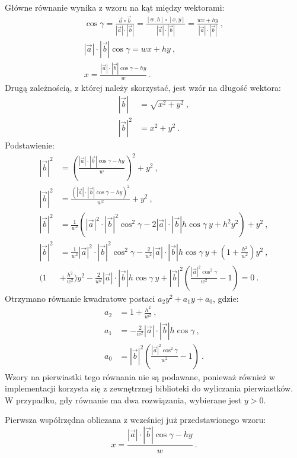 Główne równanie wynika z wzoru na kąt między wektorami:
\begin{gather*}
\cos \gamma = \frac{\vec{a}\circ\vec{b}}{|\vec{a}|\cdot |\vec{b}|} = \frac{[w, h]\circ[x, y]}{|\vec{a}|\cdot |\vec{b}|} = \frac{wx + hy}{|\vec{a}|\cdot |\vec{b}|}\ , \\[1em]
|\vec{a}|\cdot |\vec{b}| \cos \gamma = wx + hy\ , \\[1em]
x = \frac{|\vec{a}|\cdot |\vec{b}| \cos \gamma - hy}{w}\ .
\end{gather*}
Drugą zależnością, z której należy skorzystać, jest wzór na długość wektora:
\begin{align*}
|\vec{b}| &= \sqrt{x^2 + y^2}\ , \\
|\vec{b}|^2 &= x^2 + y^2\ .
\end{align*}
Podstawienie:
\begin{align*}
|\vec{b}|^2 &= \left(\frac{|\vec{a}|\cdot |\vec{b}| \cos \gamma - hy}{w}\right)^2 + y^2\ , \\ 
|\vec{b}|^2 &= \frac{(|\vec{a}|\cdot |\vec{b}| \cos \gamma - hy)^2}{w^2} + y^2\ , \\ 
|\vec{b}|^2 &= \frac{1}{w^2}\left(|\vec{a}|^2\cdot |\vec{b}|^2 \cos^2 \gamma - 2|\vec{a}|\cdot |\vec{b}|h \cos \gamma\ y + h^2 y^2\right) + y^2\ , \\ 
|\vec{b}|^2 &= \frac{1}{w^2}|\vec{a}|^2\cdot |\vec{b}|^2 \cos^2 \gamma - \frac{2}{w^2}|\vec{a}|\cdot |\vec{b}|h \cos \gamma\ y + \left(1 + \frac{h^2}{w^2}\right) y^2\ , \\
\bigg(1 &+ \frac{h^2}{w^2}\bigg)  y^2 - \frac{2}{w^2}|\vec{a}|\cdot |\vec{b}|h \cos \gamma\ y + |\vec{b}|^2\left(\frac{|\vec{a}|^2 \cos^2 \gamma}{w^2} - 1 \right) = 0\ .
\end{align*}
Otrzymano równanie kwadratowe postaci $a_2y^2 + a_1y + a_0$, gdzie:
\begin{align*}
a_2 &= 1 + \frac{h^2}{w^2}\ , \\
a_1 &= -\frac{2}{w^2}|\vec{a}|\cdot |\vec{b}|h \cos \gamma\ , \\
a_0 &= |\vec{b}|^2\left(\frac{|\vec{a}|^2 \cos^2 \gamma}{w^2} - 1 \right)\ .
\end{align*}
Wzory na pierwiastki tego równania nie są podawane, ponieważ również w implementacji korzysta się z zewnętrznej biblioteki do wyliczania pierwiastków. W przypadku, gdy równanie ma dwa rozwiązania, wybierane jest $y >0$.

Pierwsza współrzędna obliczana z wcześniej już przedstawionego wzoru:
\[
x = \frac{|\vec{a}|\cdot |\vec{b}| \cos \gamma - hy}{w}\ .
\]

